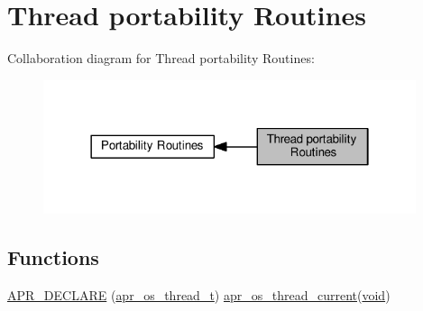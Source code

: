 \hypertarget{group__apr__os__thread}{}\section{Thread portability Routines}
\label{group__apr__os__thread}
Collaboration diagram for Thread portability Routines\+:
\nopagebreak
\begin{figure}[H]
\begin{center}
\leavevmode
\includegraphics[width=310pt]{group__apr__os__thread}
\end{center}
\end{figure}
\subsection*{Functions}
\begin{DoxyCompactItemize}
\item 
\hyperlink{group__apr__os__thread_gae8199fbc02482717675d9a4081e6f762}{A\+P\+R\+\_\+\+D\+E\+C\+L\+A\+RE} (\hyperlink{group__apr__portabile_ga4ccd9519af148ccf9cff850dd58f00b6}{apr\+\_\+os\+\_\+thread\+\_\+t}) \hyperlink{netware_2thread_8c_a152eb403e0c0b973d18b452a5a86f705}{apr\+\_\+os\+\_\+thread\+\_\+current}(\hyperlink{group__MOD__ISAPI_gacd6cdbf73df3d9eed42fa493d9b621a6}{void})
\end{DoxyCompactItemize}
